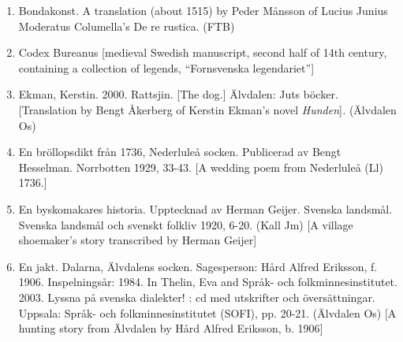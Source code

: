 \begin{enumerate}

\item[\sqbrSenum]

\label{bkm:Ref137881255}\label{bkm:Ref155341449}Bondakonst. A translation (about 1515) by Peder Månsson of Lucius Junius Moderatus Columella’s De re rustica. (FTB) 


\item[\sqbrSenum]

\label{bkm:Ref137883429}Codex Bureanus [medieval Swedish manuscript, second half of 14th century, containing a collection of legends, “Fornsvenska legendariet”] 


\item[\sqbrSenum]

\label{bkm:Ref141167264}\label{bkm:Ref150315907}Ekman, Kerstin. 2000. Rattsjin. [The dog.] Älvdalen: Juts böcker. [Translation by Bengt Åkerberg of Kerstin Ekman’s novel \textit{Hunden}]\textit{.} (Älvdalen Os)

\item[\sqbrSenum]

\label{bkm:Ref137881221}En bröllopsdikt från 1736, Nederluleå socken. Publicerad av Bengt Hesselman. Norrbotten 1929, 33-43. [A wedding poem from Nederluleå (Ll) 1736.]


\item[\sqbrSenum]

\label{bkm:Ref150587790}En byskomakares historia. Upptecknad av Herman Geijer. Svenska landsmål. Svenska landsmål och svenskt folkliv 1920, 6-20. (Kall Jm) [A village shoemaker’s story transcribed by Herman Geijer]

\item[\sqbrSenum]

\label{bkm:Ref155589051}En jakt. Dalarna, Älvdalens socken. Sagesperson: Hård Alfred Eriksson, f. 1906. Inspelningsår: 1984. In Thelin, Eva and Språk- och folkminnesinstitutet. 2003. Lyssna på svenska dialekter! : cd med utskrifter och översättningar. Uppsala: Språk- och folkminnesinstitutet (SOFI), pp. 20-21. (Älvdalen Os) [A hunting story from Älvdalen by Hård Alfred Eriksson, b. 1906]


\end{enumerate}

